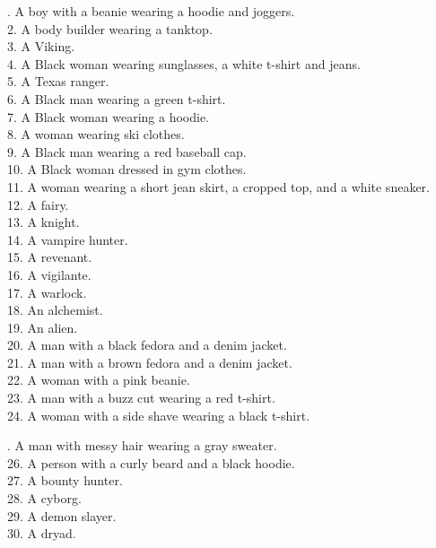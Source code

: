 \begin{framed}
    . A boy with a beanie wearing a hoodie and joggers. \\
    2. A body builder wearing a tanktop. \\
    3. A Viking. \\
    4. A Black woman wearing sunglasses, a white t-shirt and jeans. \\
    5. A Texas ranger. \\
    6. A Black man wearing a green t-shirt. \\
    7. A Black woman wearing a hoodie. \\
    8. A woman wearing ski clothes. \\
    9. A Black man wearing a red baseball cap. \\
    10. A Black woman dressed in gym clothes. \\
    11. A woman wearing a short jean skirt, a cropped top, and a white sneaker. \\
    12. A fairy. \\
    13. A knight. \\
    14. A vampire hunter. \\    
    15. A revenant. \\    
    16. A vigilante. \\    
    17. A warlock. \\    
    18. An alchemist. \\    
    19. An alien. \\    
    20. A man with a black fedora and a denim jacket. \\
    21. A man with a brown fedora and a denim jacket. \\
    22. A woman with a pink beanie. \\
    23. A man with a buzz cut wearing a red t-shirt. \\
    24. A woman with a side shave wearing a black t-shirt. \\
\end{framed}
\begin{framed}
    . A man with messy hair wearing a gray sweater. \\
    26. A person with a curly beard and a black hoodie. \\
    27. A bounty hunter. \\
    28. A cyborg. \\
    29. A demon slayer. \\
    30. A dryad.
\end{framed}


